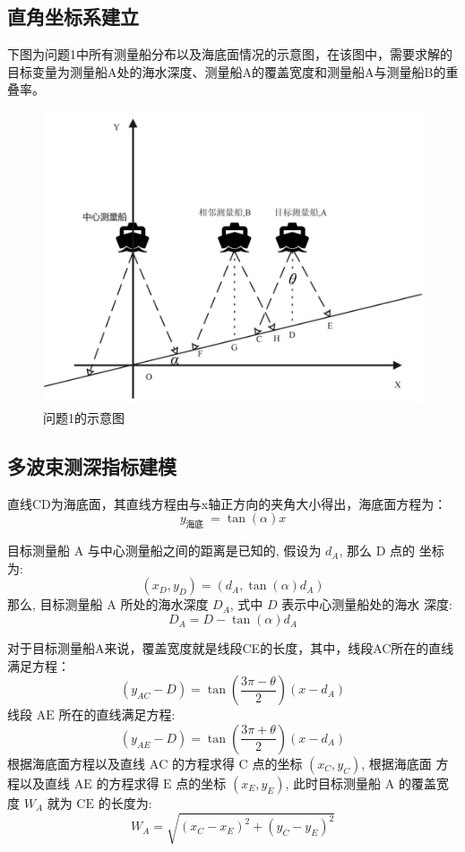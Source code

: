 \documentclass[12pt,a4paper]{article}
\begin{document}
\subsection{直角坐标系建立}
	下图为问题1中所有测量船分布以及海底面情况的示意图，在该图中，需要求解的目标变量为测量船A处的海水深度、测量船A的覆盖宽度和测量船A与测量船B的重叠率。
	\begin{figure}[H]
		\centering
		\includegraphics[width=0.8\linewidth]{media/image7}
		\caption{问题1的示意图}
		\label{fig1}
	\end{figure}
	
	\subsection{多波束测深指标建模}
	直线CD为海底面，其直线方程由与x轴正方向的夹角大小得出，海底面方程为：
	$$
	y_{\text {海底 }}=\tan (\alpha) x
	$$
	
	目标测量船 $\mathrm{A}$ 与中心测量船之间的距离是已知的, 假设为 $d_A$, 那么 $\mathrm{D}$ 点的 坐标为:
	$$
	\left(x_D, y_D\right)=\left(d_A, \tan (\alpha) d_A\right)
	$$
	那么, 目标测量船 $\mathrm{A}$ 所处的海水深度 $D_A$, 式中 $D$ 表示中心测量船处的海水 深度:
	$$
	D_A=D-\tan (\alpha) d_A
	$$
	
	对于目标测量船A来说，覆盖宽度就是线段CE的长度，其中，线段AC所在的直线满足方程：
	$$
	\left(y_{A C}-D\right)=\tan \left(\frac{3 \pi-\theta}{2}\right)\left(x-d_A\right)
	$$
	线段 $\mathrm{AE}$ 所在的直线满足方程:
	$$
	\left(y_{A E}-D\right)=\tan \left(\frac{3 \pi+\theta}{2}\right)\left(x-d_A\right)
	$$
	根据海底面方程以及直线 $\mathrm{AC}$ 的方程求得 $\mathrm{C}$ 点的坐标 $\left(x_C, y_C\right)$, 根据海底面 方程以及直线 $\mathrm{AE}$ 的方程求得 $\mathrm{E}$ 点的坐标 $\left(x_E, y_E\right)$, 此时目标测量船 $\mathrm{A}$ 的覆盖宽 度 $W_A$ 就为 $\mathrm{CE}$ 的长度为:
	$$
	W_A=\sqrt{\left(x_C-x_E\right)^2+\left(y_C-y_E\right)^2}
	$$
	
\end{document}
